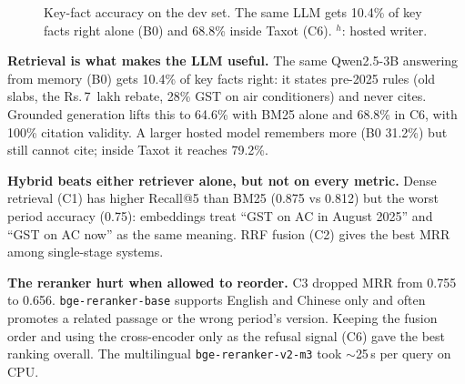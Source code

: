 \documentclass[conference]{IEEEtran}
\newcommand{\rupee}{Rs.\,}
\begin{document}
\begin{figure}[t]
\centering
{}
\caption{Key-fact accuracy on the dev set. The same LLM gets 10.4\% of key facts right alone (B0) and 68.8\%
inside Taxot (C6). $^h$: hosted writer.}
\label{fig:kf}
\end{figure}

\textbf{Retrieval is what makes the LLM useful.} The same Qwen2.5-3B answering from memory (B0) gets 10.4\% of
key facts right: it states pre-2025 rules (old slabs, the \rupee7~lakh rebate, 28\% GST on air conditioners)
and never cites. Grounded generation lifts this to 64.6\% with BM25 alone and 68.8\% in C6, with 100\%
citation validity. A larger hosted model remembers more (B0 31.2\%) but still cannot cite; inside Taxot it
reaches 79.2\%.

\textbf{Hybrid beats either retriever alone, but not on every metric.} Dense retrieval (C1) has higher
Recall@5 than BM25 (0.875 vs 0.812) but the worst period accuracy (0.75): embeddings treat ``GST on AC in
August 2025'' and ``GST on AC now'' as the same meaning. RRF fusion (C2) gives the best MRR among
single-stage systems.

\textbf{The reranker hurt when allowed to reorder.} C3 dropped MRR from 0.755 to 0.656.
\texttt{bge-reranker-base} supports English and Chinese only and often promotes a related passage or the
wrong period's version. Keeping the fusion order and using the cross-encoder only as the refusal signal (C6)
gave the best ranking overall. The multilingual \texttt{bge-reranker-v2-m3} took $\sim$25\,s per query on CPU.
\end{document}
